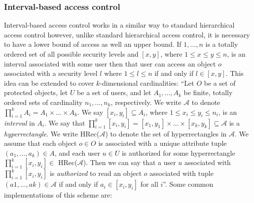 \documentclass[12pt, titlepage]{article}
\begin{document}
\subsubsection{Interval-based access control}
Interval-based access control works in a similar way to standard hierarchical access control however, unlike standard hierarchical access control, it is necessary to have a lower bound of access as well an upper bound. If $1, \dots , n$ is a totally ordered set of all possible security levels and $[x,y]$, where $1≤x≤y≤n$, is an interval associated with some user then that user can access an object $o$ associated with a security level $l$ where $1≤l≤n$ if and only if $l ∈ [x,y]$.
\newline \indent This idea can be extended to cover $k$-dimensional cardinalities:
\newline \indent ``Let $O$ be a set of protected objects, let $U$ be a set of users, and let $A_{1}, \dots , A_{k}$ be finite, totally ordered sets of cardinality $n_{1} , \dots , n_{k}$, respectively. We write $\mathcal{A}$ to denote $\prod_{i=1}^k A_{i} = A_{1} \times \dots \times A_{k}$.  
\newline \indent We say $[x_{i},y_{i}] ⊆ A_{i}$, where $1≤x_{i}≤y_{i}≤n_{i}$, is an \textit{interval} in $A_{i}$. We say that $\prod_{i=1}^k [x_{i},y_{i}] = [x_{1},y_{1}] \times \dots \times [x_{k},y_{k}] ⊆ \mathcal{A}$ is a \textit{hyperrectangle}. We write HRec($\mathcal{A}$) to denote the set of hyperrectangles in $\mathcal{A}$.
\newline \indent We assume that each object $o ∈ O$ is associated with a unique attribute tuple $(a_{1} , \dots , a_{k}) ∈ A$, and each user $u ∈ U$ is authorized for some hyperrectangle $\prod_{i=1}^k [x_{i},y_{i}] ∈$ HRec($\mathcal{A}$). Then we can say that a user $u$ associated with $\prod_{i=1}^k [x_{i},y_{i}]$ is \textit{authorized} to read an object $o$ associated with tuple $(a1 , . . . , ak) ∈ \mathcal{A}$ if and only if $a_{i} ∈ [x_{i},y_{i}]$ for all $i$''\cite{mainPaper}.
\newline \indent Some common implementations of this scheme are:\cite{mainPaper}
\end{document}
